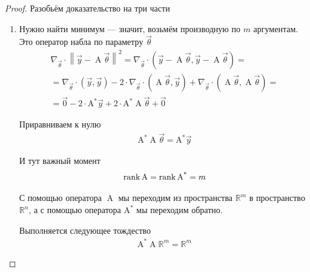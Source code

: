 \begin{proof}
    Разобьём доказательство на три части

    \begin{enumerate}
        \item Нужно найти минимум --- значит, возьмём производную по $m$
            аргументам. Это оператор набла по параметру $\vec{\theta}$
            \begin{align*}
                \nabla_{\vec{\theta}} \cdot \left\| \vec{y}
                    - \operatorname{A} \vec{\theta} \right\|^2
                = \nabla_{\vec{\theta}} \cdot
                    \left( \vec{y} - \operatorname{A} \vec{\theta},
                    \vec{y} - \operatorname{A} \vec{\theta} \right) = \\
                = \nabla_{\vec{\theta}} \cdot \left( \vec{y}, \vec{y} \right)
                    - 2 \cdot \nabla_{\vec{\theta}} \cdot
                        \left( \operatorname{A} \vec{\theta}, \vec{y} \right)
                    + \nabla_{\vec{\theta}} \cdot
                        \left( \operatorname{A} \vec{\theta},
                            \operatorname{A} \vec{\theta} \right) = \\
                = \vec{0} - 2 \cdot \operatorname{A^*} \vec{y}
                    + 2 \cdot \operatorname{A^*} \operatorname{A} \vec{\theta}
                    + \vec{0}
            \end{align*}

            Приравниваем к нулю
            \begin{align*}
                \operatorname{A^*} \operatorname{A} \vec{\theta}
                = \operatorname{A^*} \vec{y}
            \end{align*}

            И тут важный момент
            \begin{align*}
                \operatorname{rank}{\operatorname{A}} = \operatorname{rank}{\operatorname{A^*}} = m
            \end{align*}

            С помощью оператора $\operatorname{A}$ мы переходим из пространства
            $\mathbb{R}^m$ в пространство $\mathbb{R}^n$, а с помощью оператора
            $\operatorname{A^*}$ мы переходим обратно.

            Выполняется следующее тождество
            \begin{align*}
                \operatorname{A^*} \operatorname{A} \mathbb{R}^m = \mathbb{R}^m
            \end{align*}


\end{enumerate}
\end{proof}
